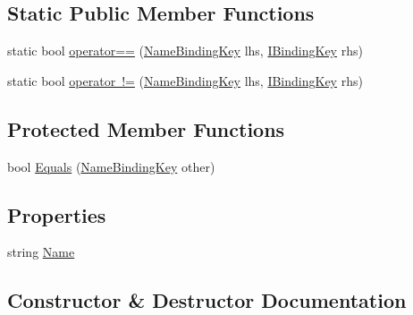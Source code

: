 \subsection*{Static Public Member Functions}
\begin{DoxyCompactItemize}
\item 
static bool \mbox{\hyperlink{classcp_games_1_1core_1_1_rapid_m_v_c_1_1src_1_1_name_binding_key_ae23da5a2c51d2a96b3ea3db76be750c4}{operator==}} (\mbox{\hyperlink{classcp_games_1_1core_1_1_rapid_m_v_c_1_1src_1_1_name_binding_key}{Name\+Binding\+Key}} lhs, \mbox{\hyperlink{interfacecp_games_1_1core_1_1_rapid_m_v_c_1_1_i_binding_key}{I\+Binding\+Key}} rhs)
\item 
static bool \mbox{\hyperlink{classcp_games_1_1core_1_1_rapid_m_v_c_1_1src_1_1_name_binding_key_a33923bcd708579a0321635f94630f179}{operator !=}} (\mbox{\hyperlink{classcp_games_1_1core_1_1_rapid_m_v_c_1_1src_1_1_name_binding_key}{Name\+Binding\+Key}} lhs, \mbox{\hyperlink{interfacecp_games_1_1core_1_1_rapid_m_v_c_1_1_i_binding_key}{I\+Binding\+Key}} rhs)
\end{DoxyCompactItemize}
\subsection*{Protected Member Functions}
\begin{DoxyCompactItemize}
\item 
bool \mbox{\hyperlink{classcp_games_1_1core_1_1_rapid_m_v_c_1_1src_1_1_name_binding_key_a333bc85a05489a2dee4ffb14af788ee8}{Equals}} (\mbox{\hyperlink{classcp_games_1_1core_1_1_rapid_m_v_c_1_1src_1_1_name_binding_key}{Name\+Binding\+Key}} other)
\end{DoxyCompactItemize}
\subsection*{Properties}
\begin{DoxyCompactItemize}
\item 
string \mbox{\hyperlink{classcp_games_1_1core_1_1_rapid_m_v_c_1_1src_1_1_name_binding_key_a336d3b40077138d51fb212817854346d}{Name}}
\end{DoxyCompactItemize}


\subsection{Constructor \& Destructor Documentation}
\mbox{\label{classcp_games_1_1core_1_1_rapid_m_v_c_1_1src_1_1_name_binding_key_a07b41734606cb97a07b15c26d463bbba}} 
